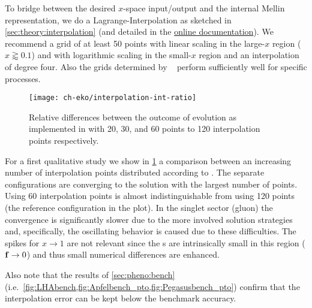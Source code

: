 To bridge between the desired $x$-space input/output and the internal
Mellin representation, we do a Lagrange-Interpolation as sketched in
\cref{sec:theory:interpolation}
(and detailed in the \href{https://eko.readthedocs.io/en/latest/}{online documentation}).
We recommend a grid of at least 50 points with
linear scaling in the large-$x$ region ($x \gtrapprox 0.1$) and with logarithmic
scaling in the small-$x$ region and an interpolation of degree four.
Also the grids determined by \amcfast~\cite{Bertone:2014zva} perform
sufficiently well for specific processes.

\begin{figure}
    \begin{center}
    \texttt{[image: ch-eko/interpolation-int-ratio]}
    \end{center}
    \caption{Relative differences between 
        the outcome of \nnlo{} \qcd{} evolution
        as implemented in \eko{} with 20, 30, and 60 points to 120
        interpolation points respectively.
        \label{fig:interpolation} }
\end{figure}

For a first qualitative study we show in \cref{fig:interpolation} a
comparison between an increasing number of interpolation points
distributed according to \cite[Eq. 2.12]{Carrazza_2020}.
The separate configurations are converging to the solution with the
largest number of points. Using 60 interpolation points is almost
indistinguishable from using 120 points (the reference configuration in the plot).
In the singlet sector (gluon) the convergence is
significantly slower due to the more involved solution strategies and,
specifically, the oscillating behavior is caused due to these difficulties.
The spikes for $x\to 1$ are not relevant since the \pdf{}s are intrinsically
small in this region ($\vb f\to 0$) and thus small numerical differences
are enhanced.

Also note that the results of \cref{sec:pheno:bench} (i.e.\ \cref{fig:LHAbench,fig:Apfelbench_pto,fig:Pegasusbench_pto}) confirm that
the interpolation error can be kept below the benchmark accuracy.
